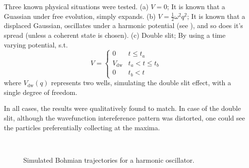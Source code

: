 Three known physical situations were tested. (a) $V=0$; It is known
that a Guassian under free evolution, simply expands. (b) $V=\frac{1}{2}\omega^{2}q^{2}$;
It is known that a displaced Gaussian, oscillates under a harmonic
potential (see ), and
so does it's spread (unless a coherent state is chosen). (c) Double
slit; By using a time varying potential, s.t. 
\[
V=\begin{cases}
0 & t\le t_{a}\\
V_{\text{dw}} & t_{a}<t\le t_{b}\\
0 & t_{b}<t
\end{cases}
\]
where $V_{\text{dw}}(q)$ represents two wells, simulating the double
slit effect, with a single degree of freedom.

In all cases, the results were qualitatively found to match. In case
of the double slit, although the wavefunction intereference pattern
was distorted, one could see the particles preferentially collecting
at the maxima. 

\begin{figure}
\begin{centering}
~~~~~~
\par\end{centering}

\caption{Simulated Bohmian trajectories for a harmonic oscillator.\label{fig:Simulated-Bohmian-Trajectories}}


%
%
\end{figure}



